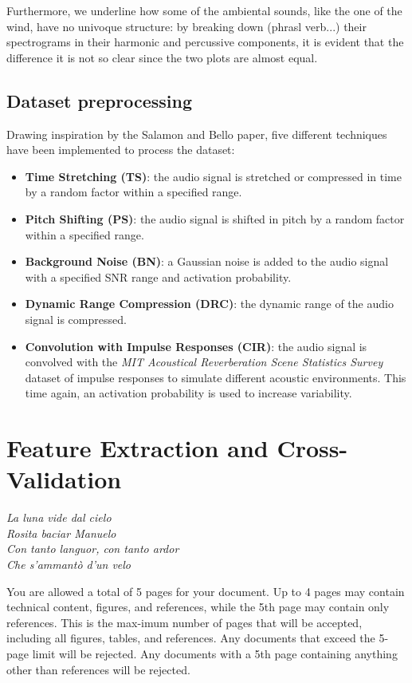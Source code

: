 \documentclass{article}
\begin{document}
\begin{sloppy}
Furthermore, we underline how some of the ambiental sounds, like the one of the wind, have no univoque structure: by breaking down (phrasl verb...)
their spectrograms in their harmonic and percussive components, it is evident that the difference it is not so clear since the two plots are almost equal.

\subsection{Dataset preprocessing}
Drawing inspiration by the Salamon and Bello paper\cite{salamon2017deep}, five different techniques have been implemented to process the dataset:
\begin{itemize}
    \item \textbf{Time Stretching (TS)}: the audio signal is stretched or compressed in time by a random factor within a specified range.
    \item \textbf{Pitch Shifting (PS)}: the audio signal is shifted in pitch by a random factor within a specified range.
    \item \textbf{Background Noise (BN)}: a Gaussian noise is added to the audio signal with a specified SNR range and activation probability.
    \item \textbf{Dynamic Range Compression (DRC)}: the dynamic range of the audio signal is compressed.
    \item \textbf{Convolution with Impulse Responses (CIR)}: the audio signal is convolved with the \textit{MIT Acoustical Reverberation Scene Statistics Survey} dataset of impulse responses\cite{traer2016statistics} to simulate different acoustic environments. This time again, an activation probability is used to increase variability.
\end{itemize}



\section{Feature Extraction and Cross-Validation}
\textit{La luna vide dal cielo}
\\\textit{Rosita baciar Manuelo}
\\\textit{Con tanto languor, con tanto ardor}
\\\textit{Che s'ammantò d'un velo}

\label{sec:pagelimit}

You are allowed a total of 5 pages for your document. Up to 4 pages may 
contain technical content, figures, and references, while the 5th page 
may contain only references. This is the max-imum number of pages that 
will be accepted, including all figures, tables, and references. Any 
documents that exceed the 5-page limit will be rejected. Any documents 
with a 5th page containing anything other than references will be rejected.



\end{sloppy}
\end{document}
